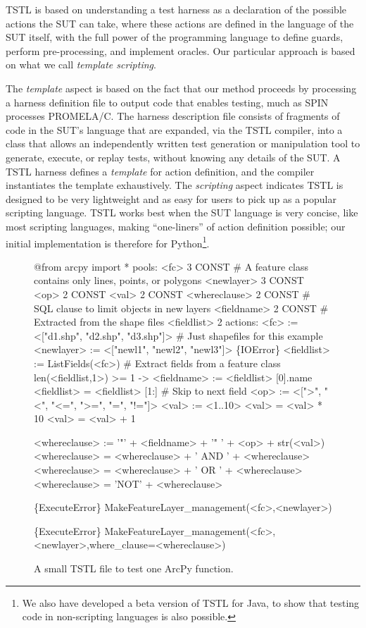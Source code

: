 TSTL is based on understanding a test harness as a declaration
  of the possible actions the SUT can take, where these actions are
defined in the language of the SUT itself, with the full power
of the programming language to define guards, perform
pre-processing, and implement oracles.  Our particular approach is
based on what we call \emph{template scripting}.

The \emph{template} aspect is based on the fact that our method
proceeds by processing a harness definition file to output code that
enables testing, much  as SPIN processes PROMELA/C.  The harness
description file consists of fragments of code in the SUT's language
that are expanded, via the TSTL compiler, into a class that allows
an independently written test generation or manipulation tool to
generate, execute, or replay tests, without knowing
any details of the SUT.
A TSTL harness defines a \emph{template} for action definition, and
the compiler 
instantiates the template exhaustively.  The \emph{scripting} aspect indicates
TSTL is designed to be very lightweight and as easy for
users to pick up as a popular scripting language.  TSTL
works best when the SUT language is very
concise, like most scripting languages, making ``one-liners'' of action
definition possible; our initial implementation \cite{tstl} is therefore for
Python\footnote{We also have developed a beta version of TSTL for Java, to show
 that testing code in non-scripting languages is also possible.}.

\begin{figure}
{\scriptsize
\begin{code}
@from arcpy import *
\vspace{0.1in}
pools:
  <fc> 3 CONST             \# A feature class contains only lines, points, or polygons
  <newlayer> 3 CONST
  <op> 2 CONST 
  <val> 2 CONST
  <whereclause> 2 CONST    \# SQL clause to limit objects in new layers
  <fieldname> 2 CONST      \# Extracted from the shape files
  <fieldlist> 2
\vspace{0.1in}
actions:
\vspace{0.1in}
<fc> := <["d1.shp", "d2.shp", "d3.shp"]>  \# Just shapefiles for this example
<newlayer> := <["newl1", "newl2", "newl3"]>
\vspace{0.05in}
\{IOError\} <fieldlist> := ListFields(<fc>) \# Extract fields from a feature class
len(<fieldlist,1>) >= 1 -> <fieldname> := <fieldlist> [0].name 
<fieldlist> = <fieldlist> [1:] \# Skip to next field
\vspace{0.05in}
<op> := <[">", "<", "<=", ">=", "=", "!="]>
<val> := <1..10>
<val> = <val> * 10
<val> = <val> + 1

<whereclause> := '"' + <fieldname> + '" ' + <op> + str(<val>)
<whereclause> = <whereclause> + ' AND ' + <whereclause>
<whereclause> = <whereclause> + ' OR ' +  <whereclause>
<whereclause> = 'NOT' + <whereclause>

\{ExecuteError\} MakeFeatureLayer\_management(<fc>,<newlayer>)

\{ExecuteError\} MakeFeatureLayer\_management(<fc>,<newlayer>,where\_clause=<whereclause>)
\end{code}
}
\caption{A small TSTL file to test one ArcPy function.}
\label{fig:makefeaturelayer}
\end{figure}

